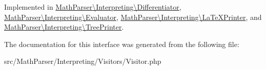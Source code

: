 Implemented in \hyperlink{classMathParser_1_1Interpreting_1_1Differentiator_a52cc092817e78043da5e6bd86e09ff9f}{Math\-Parser\textbackslash{}\-Interpreting\textbackslash{}\-Differentiator}, \hyperlink{classMathParser_1_1Interpreting_1_1Evaluator_a67cd18f0dc33f6e2755008053cd8cc0a}{Math\-Parser\textbackslash{}\-Interpreting\textbackslash{}\-Evaluator}, \hyperlink{classMathParser_1_1Interpreting_1_1LaTeXPrinter_aced38823c7de0b9ad84884028370a8d2}{Math\-Parser\textbackslash{}\-Interpreting\textbackslash{}\-La\-Te\-X\-Printer}, and \hyperlink{classMathParser_1_1Interpreting_1_1TreePrinter_a9fa160448c7e0a16e907c79c8d3e4f38}{Math\-Parser\textbackslash{}\-Interpreting\textbackslash{}\-Tree\-Printer}.



The documentation for this interface was generated from the following file\-:\begin{DoxyCompactItemize}
\item 
src/\-Math\-Parser/\-Interpreting/\-Visitors/Visitor.\-php\end{DoxyCompactItemize}
